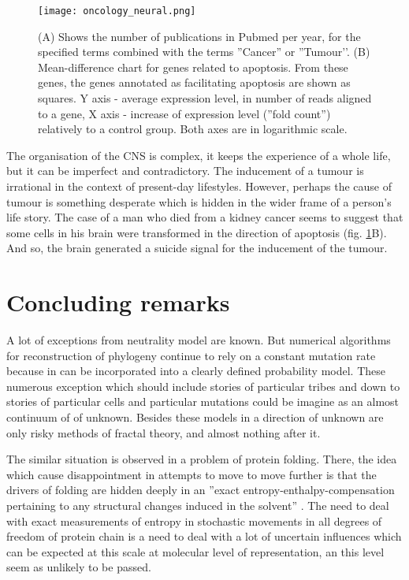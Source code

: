 \documentclass[12pt,aps]{revtex4}
\begin{document}
\begin{figure}[h]
\centerline{\texttt{[image: oncology\_neural.png]}}
\caption{(A) Shows the number of publications in Pubmed per year, for the specified
terms combined with the terms ''Cancer'' or ''Tumour’'. (B) Mean-difference chart for
genes related to apoptosis. From these genes, the genes annotated as facilitating
apoptosis are shown as squares. Y axis - average expression level, in number of
reads aligned to a gene, X axis - increase of expression level (''fold count'')
relatively to a control group. Both axes are in logarithmic scale.}
\label{fig_adaptive}
\end{figure}


The organisation of the CNS is complex, it keeps the experience of a whole life, but
it can be imperfect and contradictory. The inducement of a tumour is irrational in
the context of present-day lifestyles. However, perhaps the cause of tumour is something desperate which is hidden in the wider frame of a person’s life story. The case of a
man who died from a kidney cancer seems to suggest that some cells in his brain were
transformed in the direction of apoptosis (fig. \ref{fig_adaptive}B). And so, the brain generated a
suicide signal for the inducement of the tumour.


\section{Concluding remarks}

A lot of exceptions from neutrality model are known. But numerical algorithms for reconstruction of phylogeny continue to rely on a constant mutation rate because in can be incorporated into a clearly defined probability model. These numerous exception which should include stories of particular tribes and down to stories of particular cells and particular mutations could be imagine as an almost continuum of of unknown. Besides these models in a direction of unknown are only risky methods of fractal theory, and almost nothing after it.

The similar situation is observed in a problem of protein folding. There, the idea which cause disappointment in attempts to move to move further is that the drivers of folding are hidden deeply in an ''exact entropy-enthalpy-compensation pertaining to any structural changes induced in the solvent'' \cite{CD1}. The need to deal with exact measurements of entropy in stochastic movements in all degrees of freedom of protein chain is a need to deal with a lot of uncertain influences which can be expected at this scale at molecular level of representation, an this level seem as unlikely to be passed. 
\end{document}
